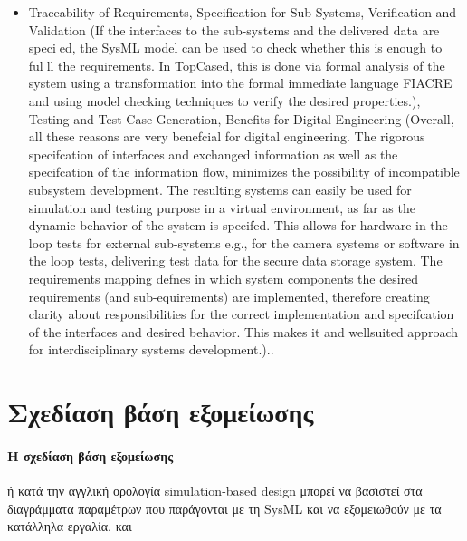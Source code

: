 \documentclass[a4paper,12pt,twoside]{report}
\begin{document}
{\begin{itemize}
				\item Traceability of Requirements, Specification for Sub-Systems, Verification and Validation (If the interfaces to the sub-systems and the delivered data are specied, the SysML model can be used to check whether this is enough to fulll the requirements. In TopCased, this is done via formal analysis of the system using a transformation into the formal immediate language FIACRE and using model checking techniques to verify the desired properties.), Testing and Test Case Generation, Benefits for Digital Engineering (Overall, all these reasons are very benefcial for digital engineering. The rigorous specifcation of interfaces and exchanged information as well as the specifcation of the information flow, minimizes the possibility of incompatible subsystem development. The resulting systems can easily be used for simulation and testing purpose in a virtual environment, as far as the dynamic behavior of the system is specifed. This allows for hardware in the loop tests for external sub-systems e.g., for the camera systems or software in the loop tests, delivering test data for the secure data storage system. The requirements mapping defnes in which system components the desired requirements (and sub-equirements) are implemented, therefore creating clarity about responsibilities for the correct implementation and specifcation of the interfaces and desired behavior. This makes it and wellsuited approach for interdisciplinary systems development.).\cite{SysMLDigitalEngineering}.
			\end{itemize}
			



		\section{Σχεδίαση βάση εξομείωσης}
			\paragraph{Η σχεδίαση βάση εξομείωσης} {ή κατά την αγγλική ορολογία simulation-based design μπορεί να βασιστεί στα διαγράμματα παραμέτρων που παράγονται με τη SysML και να εξομειωθούν με τα κατάλληλα εργαλία. \cite{SimBasedDesignP1} και \cite{SimBasedDesignP2}
			}

}
\end{document}
